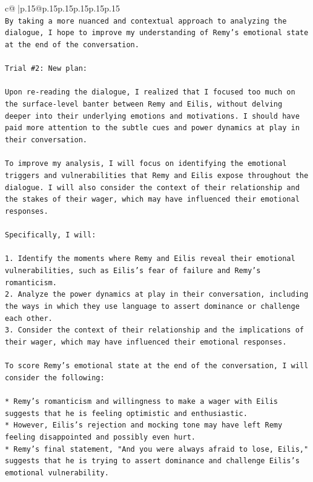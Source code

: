\documentclass{article}
\begin{document}
{\begin{supertabular}{c@{$\;$}|p{.15\linewidth}@{}p{.15\linewidth}p{.15\linewidth}p{.15\linewidth}p{.15\linewidth}p{.15\linewidth}}
{{{\\ 
\texttt{By taking a more nuanced and contextual approach to analyzing the dialogue, I hope to improve my understanding of Remy's emotional state at the end of the conversation.} \\
\\ 
\texttt{Trial \#2: New plan: } \\
\\ 
\texttt{Upon re{-}reading the dialogue, I realized that I focused too much on the surface{-}level banter between Remy and Eilis, without delving deeper into their underlying emotions and motivations. I should have paid more attention to the subtle cues and power dynamics at play in their conversation.} \\
\\ 
\texttt{To improve my analysis, I will focus on identifying the emotional triggers and vulnerabilities that Remy and Eilis expose throughout the dialogue. I will also consider the context of their relationship and the stakes of their wager, which may have influenced their emotional responses.} \\
\\ 
\texttt{Specifically, I will:} \\
\\ 
\texttt{1. Identify the moments where Remy and Eilis reveal their emotional vulnerabilities, such as Eilis's fear of failure and Remy's romanticism.} \\
\texttt{2. Analyze the power dynamics at play in their conversation, including the ways in which they use language to assert dominance or challenge each other.} \\
\texttt{3. Consider the context of their relationship and the implications of their wager, which may have influenced their emotional responses.} \\
\\ 
\texttt{To score Remy's emotional state at the end of the conversation, I will consider the following:} \\
\\ 
\texttt{* Remy's romanticism and willingness to make a wager with Eilis suggests that he is feeling optimistic and enthusiastic.} \\
\texttt{* However, Eilis's rejection and mocking tone may have left Remy feeling disappointed and possibly even hurt.} \\
\texttt{* Remy's final statement, "And you were always afraid to lose, Eilis," suggests that he is trying to assert dominance and challenge Eilis's emotional vulnerability.} \\
}}}
\end{supertabular}}
\end{document}
